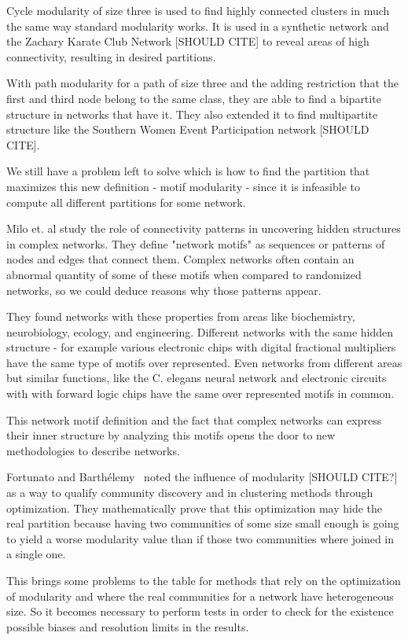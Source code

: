 Cycle modularity of size three is used to find highly connected clusters in much the same way standard modularity works. It is used in a synthetic network and the Zachary Karate Club Network [SHOULD CITE] to reveal areas of high connectivity, resulting in desired partitions.

With path modularity for a path of size three and the adding restriction that the first and third node belong to the same class, they are able to find a bipartite structure in networks that have it. They also extended it to find multipartite structure like the Southern Women Event Participation network [SHOULD CITE].

We still have a problem left to solve which is how to find the partition that maximizes this new definition - motif modularity - since it is infeasible to compute all different partitions for some network.


Milo et. al \cite{Milo2002} study the role of connectivity patterns in uncovering hidden structures in complex networks. They define "network motifs" as sequences or patterns of nodes and edges that connect them. Complex networks often contain an abnormal quantity of some of these motifs when compared to randomized networks, so we could deduce reasons why those patterns appear.

They found networks with these properties from areas like biochemistry, neurobiology, ecology, and engineering. Different networks with the same hidden structure - for example various electronic chips with digital fractional multipliers have the same type of motifs over represented. Even networks from different areas but similar functions, like the C. elegans neural network and electronic circuits with with forward logic chips have the same over represented motifs in common. 

This network motif definition and the fact that complex networks can express their inner structure by analyzing this motifs opens the door to new methodologies to describe networks.

Fortunato and Barthélemy~\cite{Fortunato2007} noted the influence of modularity [SHOULD CITE?] as a way to qualify community discovery and in clustering methods through optimization. They mathematically prove that this optimization may hide the real partition because having two communities of some size small enough is going to yield a worse modularity value than if those two communities where joined in a single one.

This brings some problems to the table for methods that rely on the optimization of modularity and where the real communities for a network have heterogeneous size. So it becomes necessary to perform tests in order to check for the existence possible biases and resolution limits in the results.

